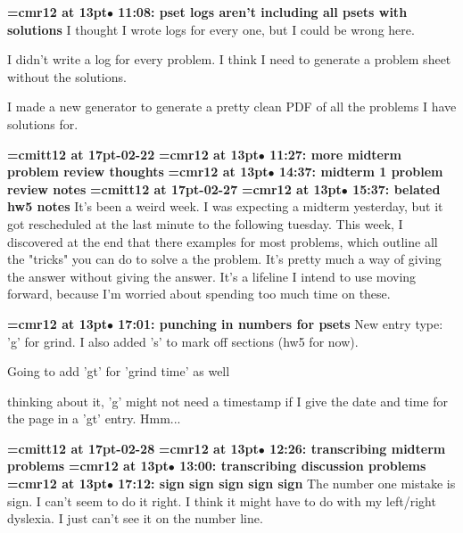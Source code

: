 {\smallskip\noindent\bf\font\titlefont=cmr12 at 13pt\titlefont $\bullet$ 11:08: pset logs aren't including all psets with solutions}\smallskip
I thought I wrote logs for every one, but I could be wrong here.
\par

I didn't write a log for every problem. I think I need to generate a problem sheet without the solutions.
\par

I made a new generator to generate a pretty clean PDF of all the problems I have solutions for.
\par

{\medskip\noindent\bf\font\titlefont=cmitt12 at 17pt-02-22}\medskip
{\smallskip\noindent\bf\font\titlefont=cmr12 at 13pt\titlefont $\bullet$ 11:27: more midterm problem review thoughts}\smallskip
{\smallskip\noindent\bf\font\titlefont=cmr12 at 13pt\titlefont $\bullet$ 14:37: midterm 1 problem review notes}\smallskip
{\medskip\noindent\bf\font\titlefont=cmitt12 at 17pt-02-27}\medskip
{\smallskip\noindent\bf\font\titlefont=cmr12 at 13pt\titlefont $\bullet$ 15:37: belated hw5 notes}\smallskip
It's been a weird week. I was expecting a midterm yesterday, but it got rescheduled at the last minute to the following tuesday. This week, I discovered at the end that there examples for most problems, which outline all the "tricks" you can do to solve a the problem. It's pretty much a way of giving the answer without giving the answer. It's a lifeline I intend to use moving forward, because I'm worried about spending too much time on these.
\par

{\smallskip\noindent\bf\font\titlefont=cmr12 at 13pt\titlefont $\bullet$ 17:01: punching in numbers for psets}\smallskip
New entry type: 'g' for grind. I also added 's' to mark off sections (hw5 for now).
\par

Going to add 'gt' for 'grind time' as well
\par

thinking about it, 'g' might not need a timestamp if I give the date and time for the page in a 'gt' entry. Hmm...
\par

{\medskip\noindent\bf\font\titlefont=cmitt12 at 17pt-02-28}\medskip
{\smallskip\noindent\bf\font\titlefont=cmr12 at 13pt\titlefont $\bullet$ 12:26: transcribing midterm problems}\smallskip
{\smallskip\noindent\bf\font\titlefont=cmr12 at 13pt\titlefont $\bullet$ 13:00: transcribing discussion problems}\smallskip
{\smallskip\noindent\bf\font\titlefont=cmr12 at 13pt\titlefont $\bullet$ 17:12: sign sign sign sign sign}\smallskip
The number one mistake is sign. I can't seem to do it right. I think it might have to do with my left/right dyslexia. I just can't see it on the number line.
\par

